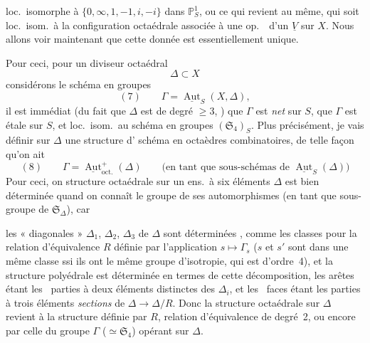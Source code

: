 \documentclass[11pt,a4paper]{article}
\begin{document}
loc.\ isomorphe à $\{0, \infty, 1, -1, i, -i\}$ dans $\mathbb{P}^1_S$, ou ce qui
revient au même, qui soit loc.\ isom.\ à la configuration octaédrale associée à
une op.\ \ d'un $\underline{V}$ sur $X$. Nous allons voir maintenant
que cette donnée est essentiellement unique.

Pour ceci, pour un diviseur octaédral \struck{\ill{}}
\[
  \Delta \subset X
\]
considérons le schéma en groupes
\[
  (7) \qquad \Gamma = \underline{\operatorname{Aut}}_S(X, \Delta),
\]
il est immédiat (du fait que $\Delta$ est de degré $\geq 3$,
)
que $\Gamma$ est
\emph{net} sur $S$,  que $\Gamma$ est étale sur $S$, et
loc.\ isom.\ au schéma en groupes $(\mathfrak{S}_4)_S$. Plus précisément, je vais
définir sur $\Delta$  une structure
d'\struck{\ill{}} schéma en octaèdres
combinatoires, de telle façon qu'on ait
\[
  (8) \qquad \Gamma = \underline{\operatorname{Aut}}^{+}_{\mathrm{oct.}}(\Delta)
  \qquad \text{(en tant que sous-schémas de } \underline{\operatorname{Aut}}_S(\Delta)\text{)}
\]
Pour ceci, on  \struck{\ill{}} structure octaédrale
sur un ens.\ à six éléments $\Delta$ est bien déterminée quand on connaît le
groupe de ses automorphismes  (en tant que sous-groupe de
$\mathfrak{S}_\Delta$), car

les « diagonales » $\Delta_1$, $\Delta_2$, $\Delta_3$ de $\Delta$ sont
déterminées , comme les
 classes pour la
relation d'équivalence $R$ définie par l'application $s \mapsto \Gamma_s$
($s$ et $s'$ sont dans une même classe ssi ils ont le même groupe d'isotropie,
qui est  d'ordre~4), et la structure polyédrale est déterminée en
termes de cette décomposition, les arêtes étant les
\ parties à deux éléments distinctes des $\Delta_i$, et les \
faces étant les parties à trois éléments \emph{sections} de
$\Delta \to \Delta/R$. Donc la structure octaédrale sur $\Delta$ revient à la
structure \struck{de} définie par $R$, relation d'équivalence de degré~2, ou
encore par celle du groupe $\Gamma$ ($\simeq \mathfrak{S}_4$) opérant sur
$\Delta$.
\end{document}
